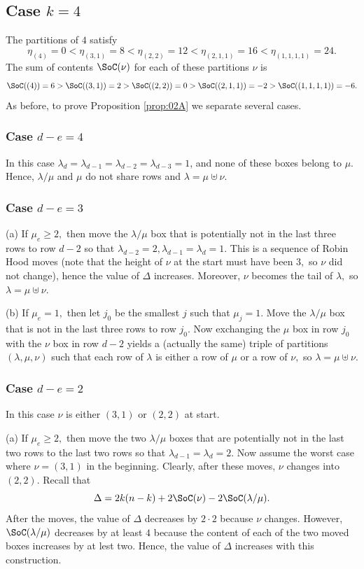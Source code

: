 \documentclass[12pt,dvipsnames,accepted=2016-08-18,a4paper,onecolumn]{quantumarticle}
\def\la{\lambda}
\def\la{\lambda}
\numberwithin{equation}{section}
\theoremstyle{definition}
\begin{document}
\subsection{Case $k=4$}

The partitions of $4$ satisfy
$$
\eta_{(4)} = 0 < \eta_{(3,1)} = 8 < \eta_{(2,2)} = 12 < \eta_{(2,1,1)} = 16 < \eta_{(1,1,1,1)} = 24.
$$
The sum of contents $\SoC(\nu)$ for each of these partitions $\nu$ is
 $$
 \SoC((4)) = 6 > \SoC((3,1)) = 2 > \SoC((2,2)) = 0 >
 \SoC((2,1,1)) = -2 > \SoC((1,1,1,1)) = -6.
 $$
As before, to prove Proposition \ref{prop:02A} we separate several cases.

\subsubsection{Case $d-e=4$}
In this case $\la_d = \la_{d-1} = \la_{d-2} = \la_{d-3} = 1$, and none of these boxes belong to $\mu$. Hence, $\la / \mu$ and $\mu$ do not share rows and $\la = \mu \uplus \nu.$

\subsubsection{Case $d-e=3$}
(a) If $\mu_e \geq 2,$ then move the $\la/\mu$ box that is potentially not in the last three rows to row $d-2$ so that $\la_{d-2}=2, \la_{d-1}=\la_d=1.$ This is a sequence of Robin Hood moves (note that the height of $\nu$ at the start must have been $3,$ so $\nu$ did not change), hence the value of $\Delta$ increases. Moreover, $\nu$ becomes the tail of $\la,$ so $\la = \mu \uplus \nu.$
 

(b) If $\mu_e=1,$ then let $j_0$ be the smallest $j$ such that $\mu_j=1.$ Move the $\la/\mu$ box that is not in the last three rows to row $j_0.$ Now exchanging the $\mu$ box in row $j_0$ with the $\nu$ box in row $d-2$ yields a (actually the same) triple of partitions $(\la,\mu,\nu)$ such that each row of $\la$ is either a row of $\mu$ or a row of $\nu,$ so $\la = \mu \uplus \nu.$

\subsubsection{Case $d-e=2$} In this case $\nu$ is either $(3,1)$ or $(2,2)$ at  start.

(a) If $\mu_e \geq 2,$ then move the two $\la/\mu$ boxes that are potentially not in the last two rows to the last two rows so that $\la_{d-1} = \la_d =2.$ Now assume the worst case where $\nu = (3,1)$ in the beginning. Clearly, after these moves, $\nu$ changes into $(2,2).$
Recall that
$$
\Delta = 2k(n-k) + 2 \SoC(\nu)-2\SoC(\la/\mu).
$$
After the moves, the value of $\Delta$ decreases by $2 \cdot 2$ because $\nu$ changes. However,  $\SoC(\la/\mu)$ decreases by at least $4$ because the content of each of the two moved boxes increases by at lest two. Hence, the value of $\Delta$ increases with this construction.
\end{document}
